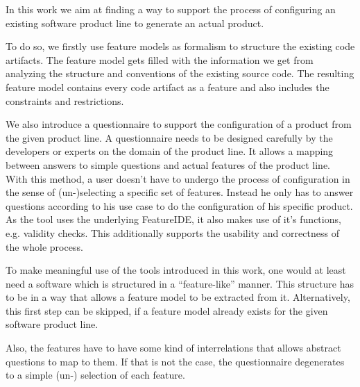 
In this work we aim at finding a way to support the process of configuring an existing software product line to generate an actual product. 

To do so, we firstly use feature models as formalism to structure the existing code artifacts. The feature model gets filled with the information we get from analyzing the structure and conventions of the existing source code. The resulting feature model contains every code artifact as a feature and also includes the constraints and restrictions.

We also introduce a questionnaire to support the configuration of a product from the given product line. A questionnaire needs to be designed carefully by the developers or experts on the domain of the product line. It allows a mapping between answers to simple questions and actual features of the product line. With this method, a user doesn't have to undergo the process of configuration in the sense of (un-)selecting a specific set of features. Instead he only has to answer questions according to his use case to do the configuration of his specific product. As the tool uses the underlying FeatureIDE, it also makes use of it's functions, e.g. validity checks. This additionally supports the usability and correctness of the whole process.


To make meaningful use of the tools introduced in this work, one would at least need a software which is structured in a ``feature-like'' manner. This structure has to be in a way that allows a feature model to be extracted from it. Alternatively, this first step can be skipped, if a feature model already exists for the given software product line.

Also, the features have to have some kind of interrelations that allows abstract questions to map to them. If that is not the case, the questionnaire degenerates to a simple (un-) selection of each feature.